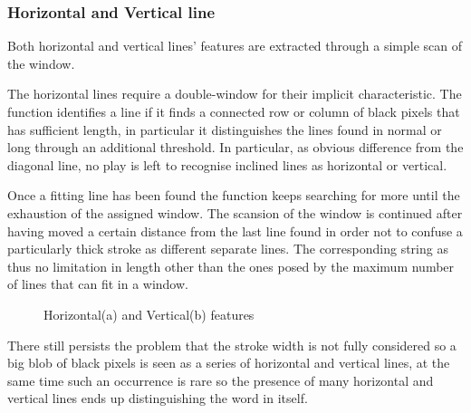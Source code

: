 \subsubsection{Horizontal and Vertical line}
Both horizontal and vertical lines' features are extracted through
a simple scan of the window.

The horizontal lines require a double-window for their implicit characteristic.
The function identifies a line if it finds a connected row or column of black pixels that has sufficient length, in particular it distinguishes the lines found in normal or long through an additional threshold.
In particular, as obvious difference from the diagonal line, no play is left to recognise inclined lines as horizontal or vertical.

Once a fitting line has been found the function keeps searching for more until the exhaustion of the assigned window. The scansion of the window is continued after having moved a certain distance from the last line found in order not to confuse a particularly thick stroke as different separate lines.
The corresponding string as thus no limitation in length other than the ones posed by the maximum number of lines that can fit in a window.

\begin{figure}[!htpb]
 \centering
 \hspace{15mm}
 \caption{Horizontal(a) and Vertical(b) features}
  \end{figure}
\vspace{2mm}

There still persists the problem that the stroke width is not fully considered so a big blob of black pixels is seen as a series of horizontal and vertical lines, at the same time such an occurrence is rare so the presence of many horizontal and vertical lines ends up distinguishing the word in itself.    
\newpage
